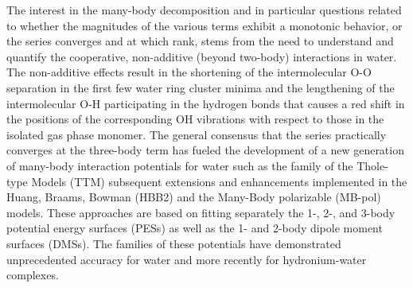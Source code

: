 \documentclass [11pt, proquest] {uwthesis}[2020/02/24]
\begin{document}
\par The interest in the many-body decomposition and in particular questions related to whether the magnitudes of the various terms exhibit a monotonic behavior, or the series converges and at which rank, stems from the need to understand and quantify the cooperative, non-additive (beyond two-body) interactions in water. The non-additive effects result in the shortening of the intermolecular O-O separation in the first few water ring cluster minima\autocite{xantheas_ab_1993, miliordos_optimal_2013} and the lengthening of the intermolecular O-H participating in the hydrogen bonds that causes a red shift in the positions of the corresponding OH vibrations with respect to those in the isolated gas phase monomer.\autocite{burnham_formation_2002} The general consensus that the series practically converges at the three-body term has fueled the development of a new generation of many-body interaction potentials for water such as the family of the Thole-type Models (TTM)\autocite{burnham_parametrization_1999, burnham_development_2002, burnham_development_2002-1, fanourgakis_flexible_2006, fanourgakis_development_2008} subsequent extensions and enhancements implemented in the Huang, Braams, Bowman (HBB2)\autocite{shank_accurate_2009, wang_towards_2010} and the Many-Body polarizable (MB-pol)\autocite{babin_toward_2012, babin_development_2013, babin_development_2013-1, babin_development_2014} models. These approaches are based on fitting separately the 1-, 2-, and 3-body potential energy surfaces (PESs) as well as the 1- and 2-body dipole moment surfaces (DMSs). The families of these potentials have demonstrated unprecedented accuracy for water\autocite{babin_development_2013, babin_development_2014, paesani_quantum_2007} and more recently for hydronium-water complexes\autocite{heindel_benchmark_2018}.
\end{document}
